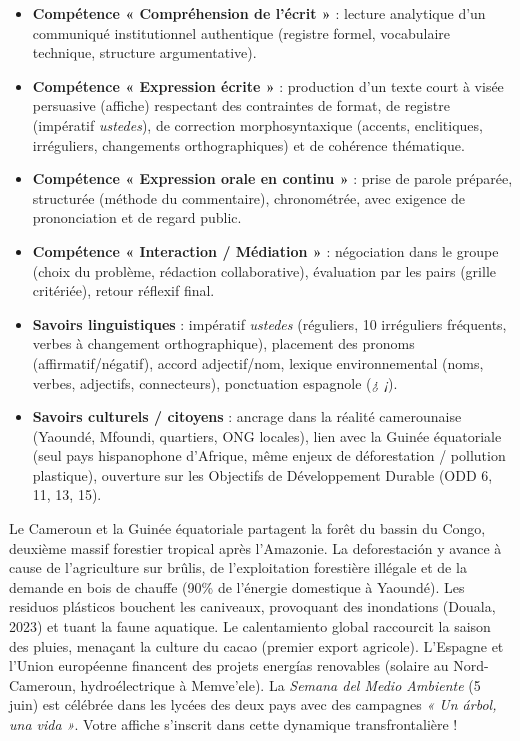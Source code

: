 \documentclass[11pt]{article}
\newcommand{\cle}[1]{{\popxbold\color{popdark}#1}}
\newcounter{popsec}
\newcounter{popsub}
\newcommand{\courssub}[1]{%
  \stepcounter{popsub}%
  \par\vspace{9pt}\noindent{\popxbold\fontsize{11.5}{13}\selectfont\color{popink}{\color{poporange}\thepopsec.\thepopsub}\hspace{6pt}#1}\par\nopagebreak\vspace{4pt}
}
\begin{document}
\courssub{Bilan de l'activité}

\begin{aretenir}
\begin{itemize}
    \item \textbf{Compétence « Compréhension de l'écrit »} : lecture analytique d'un communiqué institutionnel authentique (registre formel, vocabulaire technique, structure argumentative).
    \item \textbf{Compétence « Expression écrite »} : production d'un texte court à visée persuasive (affiche) respectant des contraintes de format, de registre (impératif \emph{ustedes}), de correction morphosyntaxique (accents, enclitiques, irréguliers, changements orthographiques) et de cohérence thématique.
    \item \textbf{Compétence « Expression orale en continu »} : prise de parole préparée, structurée (méthode du commentaire), chronométrée, avec exigence de prononciation et de regard public.
    \item \textbf{Compétence « Interaction / Médiation »} : négociation dans le groupe (choix du problème, rédaction collaborative), évaluation par les pairs (grille critériée), retour réflexif final.
    \item \textbf{Savoirs linguistiques} : impératif \emph{ustedes} (réguliers, 10 irréguliers fréquents, verbes à changement orthographique), placement des pronoms (affirmatif/négatif), accord adjectif/nom, lexique environnemental (noms, verbes, adjectifs, connecteurs), ponctuation espagnole (\emph{¿ ¡}).
    \item \textbf{Savoirs culturels / citoyens} : ancrage dans la réalité camerounaise (Yaoundé, Mfoundi, quartiers, ONG locales), lien avec la Guinée équatoriale (seul pays hispanophone d'Afrique, même enjeux de déforestation / pollution plastique), ouverture sur les Objectifs de Développement Durable (ODD 6, 11, 13, 15).
\end{itemize}
\end{aretenir}

\begin{savaistu}
Le Cameroun et la Guinée équatoriale partagent la forêt du bassin du Congo, deuxième massif forestier tropical après l'Amazonie. La \cle{deforestación} y avance à cause de l'agriculture sur brûlis, de l'exploitation forestière illégale et de la demande en bois de chauffe (90\% de l'énergie domestique à Yaoundé). Les \cle{residuos plásticos} bouchent les caniveaux, provoquant des inondations (Douala, 2023) et tuant la faune aquatique. Le \cle{calentamiento global} raccourcit la saison des pluies, menaçant la culture du cacao (premier export agricole). L'Espagne et l'Union européenne financent des projets \cle{energías renovables} (solaire au Nord-Cameroun, hydroélectrique à Memve'ele). La \emph{Semana del Medio Ambiente} (5 juin) est célébrée dans les lycées des deux pays avec des campagnes \emph{« Un árbol, una vida »}. Votre affiche s'inscrit dans cette dynamique transfrontalière !
\end{savaistu}
\end{document}
